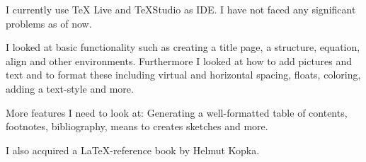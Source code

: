\documentclass{article}
\begin{document}
	I currently use TeX Live and TeXStudio as IDE. I have not faced any significant problems as of now.
	
	\bigskip
	
	I looked at basic functionality such as creating a title page, a structure, equation, align and other environments. Furthermore I looked at how to add pictures and text and to format these including virtual and horizontal spacing, floats, coloring, adding a text-style and more.
	
	\bigskip
	
	More features I need to look at: Generating a well-formatted table of contents, footnotes, bibliography, means to creates sketches and more.
	
	\bigskip
	
	I also acquired a \LaTeX-reference book by Helmut Kopka.
	
	
\end{document}
